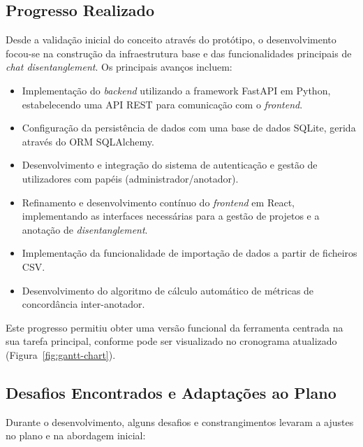 \subsection{Progresso Realizado}
Desde a validação inicial do conceito através do protótipo, o desenvolvimento focou-se na construção da infraestrutura base e das funcionalidades principais de \textit{chat disentanglement}. Os principais avanços incluem:
\begin{itemize}
    \item Implementação do \textit{backend} utilizando a framework FastAPI em Python, estabelecendo uma API REST para comunicação com o \textit{frontend}.
    \item Configuração da persistência de dados com uma base de dados SQLite, gerida através do ORM SQLAlchemy.
    \item Desenvolvimento e integração do sistema de autenticação e gestão de utilizadores com papéis (administrador/anotador).
    \item Refinamento e desenvolvimento contínuo do \textit{frontend} em React, implementando as interfaces necessárias para a gestão de projetos e a anotação de \textit{disentanglement}.
    \item Implementação da funcionalidade de importação de dados a partir de ficheiros CSV.
    \item Desenvolvimento do algoritmo de cálculo automático de métricas de concordância inter-anotador.
\end{itemize}
Este progresso permitiu obter uma versão funcional da ferramenta centrada na sua tarefa principal, conforme pode ser visualizado no cronograma atualizado (Figura~\ref{fig:gantt-chart}).

\subsection{Desafios Encontrados e Adaptações ao Plano}
Durante o desenvolvimento, alguns desafios e constrangimentos levaram a ajustes no plano e na abordagem inicial:

